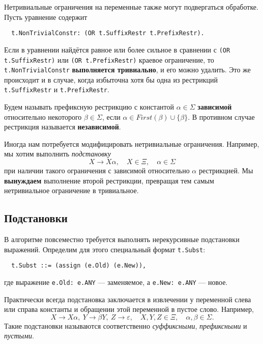 \documentclass[12pt]{article}
\begin{document}
Нетривиальные ограничения на переменные также могут подвергаться обработке.
Пусть уравнение содержит
\begin{Verbatim}
  t.NonTrivialConstr: (OR t.SuffixRestr t.PrefixRestr).
\end{Verbatim}
Если в уравнении найдётся равное или более сильное в сравнении с
\texttt{(OR t.SuffixRestr)} или \texttt{(OR t.PrefixRestr)} краевое
ограничение, то \texttt{t.NonTrivialConstr} \textbf{выполняется тривиально},
и его можно удалить. Это же происходит и в случае, когда избыточна хотя
бы одна из рестрикций \texttt{t.SuffixRestr} и \texttt{t.PrefixRestr}.

Будем называть префиксную рестрикцию с константой $\alpha \in \Sigma$
\textbf{зависимой} относительно некоторого $\beta \in \Sigma$, если
$\alpha \in First(\beta) \cup \{\beta\}$. В противном случае рестрикция
называется \textbf{независимой}.

Иногда нам потребуется модифицировать нетривиальные ограничения. Например, мы
хотим выполнить \textit{подстановку}
\begin{displaymath}
  X \to X \alpha, \quad X \in \Xi, \quad \alpha \in \Sigma
\end{displaymath}
при наличии такого ограничения с зависимой относительно $\alpha$ рестрикцией.
Мы \textbf{вынуждаем} выполнение второй рестрикции, превращая тем самым
нетривиальное ограничение в тривиальное.


\subsection{Подстановки}

В алгоритме повсеместно требуется выполнять нерекурсивные подстановки
выражений. Определим для этого специальный формат \texttt{t.Subst}:
\begin{Verbatim}
  t.Subst ::= (assign (e.Old) (e.New)),
\end{Verbatim}
где выражение \texttt{e.Old: e.ANY} --- заменяемое, а \texttt{e.New: e.ANY}
--- новое.

Практически всегда подстановка заключается в извлечении у переменной слева или
справа константы и обращении этой переменной в пустое слово. Например,
\begin{displaymath}
  X \to X \alpha, \ Y \to \beta Y, \ Z \to \varepsilon,
  \quad X, Y, Z \in \Xi,
  \quad \alpha, \beta \in \Sigma.
\end{displaymath}
Такие подстановки называются соответственно \textit{суффиксными},
\textit{префиксными} и \textit{пустыми}.
\end{document}
